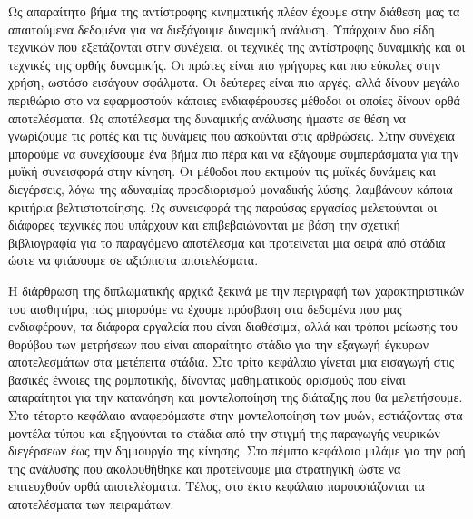 Ως απαραίτητο βήμα της αντίστροφης κινηματικής πλέον έχουμε στην διάθεση μας τα απαιτούμενα δεδομένα για να διεξάγουμε δυναμική ανάλυση. Υπάρχουν δυο είδη τεχνικών που εξετάζονται στην συνέχεια, οι τεχνικές της αντίστροφης δυναμικής και οι τεχνικές της ορθής δυναμικής. Οι πρώτες είναι πιο γρήγορες και πιο εύκολες στην χρήση, ωστόσο εισάγουν σφάλματα. Οι δεύτερες είναι πιο αργές, αλλά δίνουν μεγάλο περιθώριο στο να εφαρμοστούν κάποιες ενδιαφέρουσες μέθοδοι οι οποίες δίνουν ορθά αποτελέσματα. Ως αποτέλεσμα της δυναμικής ανάλυσης ήμαστε σε θέση να γνωρίζουμε τις ροπές και τις δυνάμεις που ασκούνται στις αρθρώσεις. Στην συνέχεια μπορούμε να συνεχίσουμε ένα βήμα πιο πέρα και να εξάγουμε συμπεράσματα για την μυϊκή συνεισφορά στην κίνηση. Οι μέθοδοι που εκτιμούν τις μυϊκές δυνάμεις και διεγέρσεις, λόγω της αδυναμίας προσδιορισμού μοναδικής λύσης, λαμβάνουν κάποια κριτήρια βελτιστοποίησης. Ως συνεισφορά της παρούσας εργασίας μελετούνται οι διάφορες τεχνικές που υπάρχουν και επιβεβαιώνονται με βάση την σχετική βιβλιογραφία για το παραγόμενο αποτέλεσμα και προτείνεται μια σειρά από στάδια ώστε να φτάσουμε σε αξιόπιστα αποτελέσματα.

Η διάρθρωση της διπλωματικής αρχικά ξεκινά με την περιγραφή των χαρακτηριστικών του αισθητήρα, πώς μπορούμε να έχουμε πρόσβαση στα δεδομένα που μας ενδιαφέρουν, τα διάφορα εργαλεία που είναι διαθέσιμα, αλλά και τρόποι μείωσης του θορύβου των μετρήσεων που είναι απαραίτητο στάδιο για την εξαγωγή έγκυρων αποτελεσμάτων στα μετέπειτα στάδια. Στο τρίτο κεφάλαιο γίνεται μια εισαγωγή στις βασικές έννοιες της ρομποτικής, δίνοντας μαθηματικούς ορισμούς που είναι απαραίτητοι για την κατανόηση και μοντελοποίηση της διάταξης που θα μελετήσουμε. Στο τέταρτο κεφάλαιο αναφερόμαστε στην μοντελοποίηση των μυών, εστιάζοντας στα μοντέλα τύπου  και εξηγούνται τα στάδια από την στιγμή της παραγωγής νευρικών διεγέρσεων έως την δημιουργία της κίνησης. Στο πέμπτο κεφάλαιο μιλάμε για την ροή της ανάλυσης που ακολουθήθηκε και προτείνουμε μια στρατηγική ώστε να επιτευχθούν ορθά αποτελέσματα. Τέλος, στο έκτο κεφάλαιο παρουσιάζονται τα αποτελέσματα των πειραμάτων.

